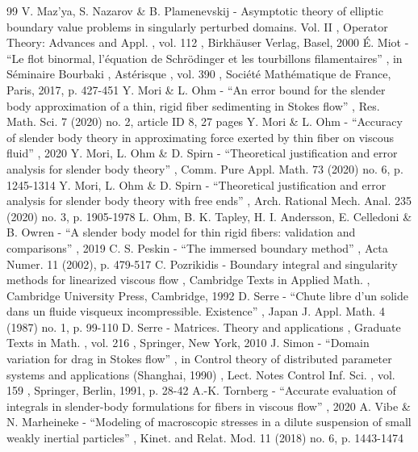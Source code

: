 \begin{thebibliography}{99}
 V. Maz’ya, S. Nazarov \& B. Plamenevskij - Asymptotic theory of elliptic boundary value problems in singularly perturbed domains. Vol. II , Operator Theory: Advances and Appl. , vol. 112 , Birkhäuser Verlag, Basel, 2000
 É. Miot - “Le flot binormal, l’équation de Schrödinger et les tourbillons filamentaires” , in Séminaire Bourbaki , Astérisque , vol. 390 , Société Mathématique de France, Paris, 2017, p. 427-451
 Y. Mori \& L. Ohm - “An error bound for the slender body approximation of a thin, rigid fiber sedimenting in Stokes flow” , Res. Math. Sci. 7 (2020) no. 2, article ID 8, 27 pages
 Y. Mori \& L. Ohm - “Accuracy of slender body theory in approximating force exerted by thin fiber on viscous fluid” , 2020
 Y. Mori, L. Ohm \& D. Spirn - “Theoretical justification and error analysis for slender body theory” , Comm. Pure Appl. Math. 73 (2020) no. 6, p. 1245-1314
 Y. Mori, L. Ohm \& D. Spirn - “Theoretical justification and error analysis for slender body theory with free ends” , Arch. Rational Mech. Anal. 235 (2020) no. 3, p. 1905-1978
 L. Ohm, B. K. Tapley, H. I. Andersson, E. Celledoni \& B. Owren - “A slender body model for thin rigid fibers: validation and comparisons” , 2019
 C. S. Peskin - “The immersed boundary method” , Acta Numer. 11 (2002), p. 479-517
 C. Pozrikidis - Boundary integral and singularity methods for linearized viscous flow , Cambridge Texts in Applied Math. , Cambridge University Press, Cambridge, 1992
 D. Serre - “Chute libre d’un solide dans un fluide visqueux incompressible. Existence” , Japan J. Appl. Math. 4 (1987) no. 1, p. 99-110
 D. Serre - Matrices. Theory and applications , Graduate Texts in Math. , vol. 216 , Springer, New York, 2010
 J. Simon - “Domain variation for drag in Stokes flow” , in Control theory of distributed parameter systems and applications (Shanghai, 1990) , Lect. Notes Control Inf. Sci. , vol. 159 , Springer, Berlin, 1991, p. 28-42
 A.-K. Tornberg - “Accurate evaluation of integrals in slender-body formulations for fibers in viscous flow” , 2020
 A. Vibe \& N. Marheineke - “Modeling of macroscopic stresses in a dilute suspension of small weakly inertial particles” , Kinet. and Relat. Mod. 11 (2018) no. 6, p. 1443-1474
\end{thebibliography}
